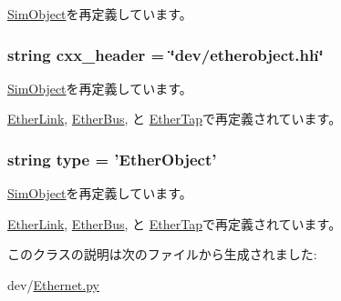 \hyperlink{classm5_1_1SimObject_1_1SimObject_a17fa61ac3806b481cafee5593b55e5d0}{SimObject}を再定義しています。\hypertarget{classEthernet_1_1EtherObject_a17da7064bc5c518791f0c891eff05fda}{
\subsubsection[{cxx\_\-header}]{\setlength{\rightskip}{0pt plus 5cm}string {\bf cxx\_\-header} = \char`\"{}dev/etherobject.hh\char`\"{}}}
\label{classEthernet_1_1EtherObject_a17da7064bc5c518791f0c891eff05fda}


\hyperlink{classm5_1_1SimObject_1_1SimObject_a17da7064bc5c518791f0c891eff05fda}{SimObject}を再定義しています。

\hyperlink{classEthernet_1_1EtherLink_a17da7064bc5c518791f0c891eff05fda}{EtherLink}, \hyperlink{classEthernet_1_1EtherBus_a17da7064bc5c518791f0c891eff05fda}{EtherBus}, と \hyperlink{classEthernet_1_1EtherTap_a17da7064bc5c518791f0c891eff05fda}{EtherTap}で再定義されています。\hypertarget{classEthernet_1_1EtherObject_acce15679d830831b0bbe8ebc2a60b2ca}{
\subsubsection[{type}]{\setlength{\rightskip}{0pt plus 5cm}string {\bf type} = '{\bf EtherObject}'}}
\label{classEthernet_1_1EtherObject_acce15679d830831b0bbe8ebc2a60b2ca}


\hyperlink{classm5_1_1SimObject_1_1SimObject_acce15679d830831b0bbe8ebc2a60b2ca}{SimObject}を再定義しています。

\hyperlink{classEthernet_1_1EtherLink_acce15679d830831b0bbe8ebc2a60b2ca}{EtherLink}, \hyperlink{classEthernet_1_1EtherBus_acce15679d830831b0bbe8ebc2a60b2ca}{EtherBus}, と \hyperlink{classEthernet_1_1EtherTap_acce15679d830831b0bbe8ebc2a60b2ca}{EtherTap}で再定義されています。

このクラスの説明は次のファイルから生成されました:\begin{DoxyCompactItemize}
\item 
dev/\hyperlink{Ethernet_8py}{Ethernet.py}\end{DoxyCompactItemize}
